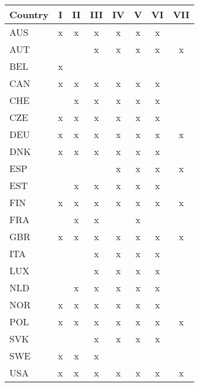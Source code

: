 \begin{tabular}{lccccccc}
Country & I & II & III & IV & V & VI & VII \\  \hline 
AUS&x&x&x&x&x&x&\\
AUT&&&x&x&x&x&x\\
BEL&x&&&&&&\\
CAN&x&x&x&x&x&x&\\
CHE&&x&x&x&x&x&\\
CZE&x&x&x&x&x&x&\\
DEU&x&x&x&x&x&x&x\\
DNK&x&x&x&x&x&x&\\
ESP&&&&x&x&x&x\\
EST&&x&x&x&x&x&\\
FIN&x&x&x&x&x&x&x\\
FRA&&x&x&&x&&\\
GBR&x&x&x&x&x&x&x\\
ITA&&&x&x&x&x&\\
LUX&&&x&x&x&x&\\
NLD&&x&x&x&x&x&\\
NOR&x&x&x&x&x&x&\\
POL&x&x&x&x&x&x&x\\
SVK&&&x&x&x&x&\\
SWE&x&x&x&&&&\\
USA&x&x&x&x&x&x&x\\
\hline \end{tabular}
